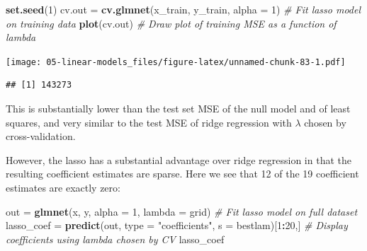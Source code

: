 \documentclass[
  openany]{book}
\newenvironment{Shaded}{\begin{snugshade}}{\end{snugshade}}
\newcommand{\CommentTok}[1]{\textcolor[rgb]{0.56,0.35,0.01}{\textit{#1}}}
\newcommand{\DataTypeTok}[1]{\textcolor[rgb]{0.13,0.29,0.53}{#1}}
\newcommand{\DecValTok}[1]{\textcolor[rgb]{0.00,0.00,0.81}{#1}}
\newcommand{\KeywordTok}[1]{\textcolor[rgb]{0.13,0.29,0.53}{\textbf{#1}}}
\newcommand{\NormalTok}[1]{#1}
\newcommand{\OperatorTok}[1]{\textcolor[rgb]{0.81,0.36,0.00}{\textbf{#1}}}
\newcommand{\StringTok}[1]{\textcolor[rgb]{0.31,0.60,0.02}{#1}}
\begin{document}
\begin{Shaded}
\begin{Highlighting}[]
\KeywordTok{set.seed}\NormalTok{(}\DecValTok{1}\NormalTok{)}
\NormalTok{cv.out =}\StringTok{ }\KeywordTok{cv.glmnet}\NormalTok{(x_train, y_train, }\DataTypeTok{alpha =} \DecValTok{1}\NormalTok{) }\CommentTok{# Fit lasso model on training data}
\KeywordTok{plot}\NormalTok{(cv.out) }\CommentTok{# Draw plot of training MSE as a function of lambda}
\end{Highlighting}
\end{Shaded}

\texttt{[image: 05-linear-models\_files/figure-latex/unnamed-chunk-83-1.pdf]}

\begin{Shaded}
\end{Shaded}

\begin{verbatim}
## [1] 143273
\end{verbatim}

This is substantially lower than the test set MSE of the null model and of
least squares, and very similar to the test MSE of ridge regression with \(\lambda\)
chosen by cross-validation.

However, the lasso has a substantial advantage over ridge regression in
that the resulting coefficient estimates are sparse. Here we see that 12 of
the 19 coefficient estimates are exactly zero:

\begin{Shaded}
\begin{Highlighting}[]
\NormalTok{out =}\StringTok{ }\KeywordTok{glmnet}\NormalTok{(x, y, }\DataTypeTok{alpha =} \DecValTok{1}\NormalTok{, }\DataTypeTok{lambda =}\NormalTok{ grid) }\CommentTok{# Fit lasso model on full dataset}
\NormalTok{lasso_coef =}\StringTok{ }\KeywordTok{predict}\NormalTok{(out, }\DataTypeTok{type =} \StringTok{"coefficients"}\NormalTok{, }\DataTypeTok{s =}\NormalTok{ bestlam)[}\DecValTok{1}\OperatorTok{:}\DecValTok{20}\NormalTok{,] }\CommentTok{# Display coefficients using lambda chosen by CV}
\NormalTok{lasso_coef}
\end{Highlighting}
\end{Shaded}
\end{document}
